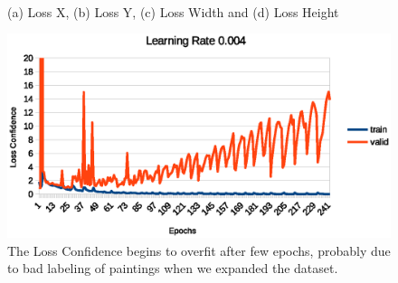 \documentclass[10pt,twocolumn,letterpaper]{article}
\begin{document}
\begin{figure}
    \centering
    \\
    \caption{(a) Loss X, (b) Loss Y, (c) Loss Width and (d) Loss Height}
    \label{fig:foobar}
\end{figure}

\begin{figure}[t]
\begin{center}
   \includegraphics[width=1\linewidth]{loss_conf.eps}
\end{center}
   \caption{The Loss Confidence begins to overfit after few epochs, probably due to bad labeling of
paintings when we expanded the dataset.}
\label{fig:long}
\label{fig:onecol}
\end{figure}
\end{document}
